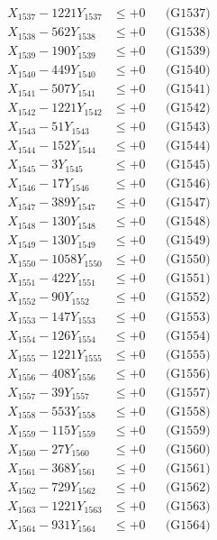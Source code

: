 \documentclass[a4paper,10pt]{article}
\begin{document}
{\begin{align}
X_{1537} - 1221Y_{1537} &\leq +0 && \text{(G1537)} \\
X_{1538} - 562Y_{1538} &\leq +0 && \text{(G1538)} \\
X_{1539} - 190Y_{1539} &\leq +0 && \text{(G1539)} \\
X_{1540} - 449Y_{1540} &\leq +0 && \text{(G1540)} \\
\allowbreak
X_{1541} - 507Y_{1541} &\leq +0 && \text{(G1541)} \\
X_{1542} - 1221Y_{1542} &\leq +0 && \text{(G1542)} \\
X_{1543} - 51Y_{1543} &\leq +0 && \text{(G1543)} \\
X_{1544} - 152Y_{1544} &\leq +0 && \text{(G1544)} \\
X_{1545} - 3Y_{1545} &\leq +0 && \text{(G1545)} \\
X_{1546} - 17Y_{1546} &\leq +0 && \text{(G1546)} \\
X_{1547} - 389Y_{1547} &\leq +0 && \text{(G1547)} \\
X_{1548} - 130Y_{1548} &\leq +0 && \text{(G1548)} \\
X_{1549} - 130Y_{1549} &\leq +0 && \text{(G1549)} \\
X_{1550} - 1058Y_{1550} &\leq +0 && \text{(G1550)} \\
\allowbreak
X_{1551} - 422Y_{1551} &\leq +0 && \text{(G1551)} \\
X_{1552} - 90Y_{1552} &\leq +0 && \text{(G1552)} \\
X_{1553} - 147Y_{1553} &\leq +0 && \text{(G1553)} \\
X_{1554} - 126Y_{1554} &\leq +0 && \text{(G1554)} \\
X_{1555} - 1221Y_{1555} &\leq +0 && \text{(G1555)} \\
X_{1556} - 408Y_{1556} &\leq +0 && \text{(G1556)} \\
X_{1557} - 39Y_{1557} &\leq +0 && \text{(G1557)} \\
X_{1558} - 553Y_{1558} &\leq +0 && \text{(G1558)} \\
X_{1559} - 115Y_{1559} &\leq +0 && \text{(G1559)} \\
X_{1560} - 27Y_{1560} &\leq +0 && \text{(G1560)} \\
\allowbreak
X_{1561} - 368Y_{1561} &\leq +0 && \text{(G1561)} \\
X_{1562} - 729Y_{1562} &\leq +0 && \text{(G1562)} \\
X_{1563} - 1221Y_{1563} &\leq +0 && \text{(G1563)} \\
X_{1564} - 931Y_{1564} &\leq +0 && \text{(G1564)} \\

\end{align}}
\end{document}
